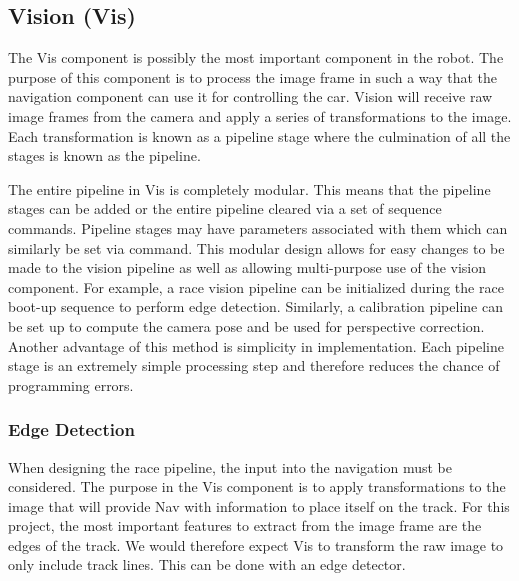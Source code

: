 \documentclass{article}
\begin{document}
\subsection{Vision (Vis)}

The Vis component is possibly the most important component in the robot. The purpose of this component is to process the image frame in such a way that the navigation component can use it for controlling the car. Vision will receive raw image frames from the camera and apply a series of transformations to the image. Each transformation is known as a pipeline stage where the culmination of all the stages is known as the pipeline.

The entire pipeline in Vis is completely modular. This means that the pipeline stages can be added or the entire pipeline cleared via a set of sequence commands. Pipeline stages may have parameters associated with them which can similarly be set via command. This modular design allows for easy changes to be made to the vision pipeline as well as allowing multi-purpose use of the vision component. For example, a race vision pipeline can be initialized during the race boot-up sequence to perform edge detection. Similarly, a calibration pipeline can be set up to compute the camera pose and be used for perspective correction. Another advantage of this method is simplicity in implementation. Each pipeline stage is an extremely simple processing step and therefore reduces the chance of programming errors.

\subsubsection{Edge Detection}

When designing the race pipeline, the input into the navigation must be considered. The purpose in the Vis component is to apply transformations to the image that will provide Nav with information to place itself on the track. For this project, the most important features to extract from the image frame are the edges of the track. We would therefore expect Vis to transform the raw image to only include track lines. This can be done with an edge detector.
\end{document}
